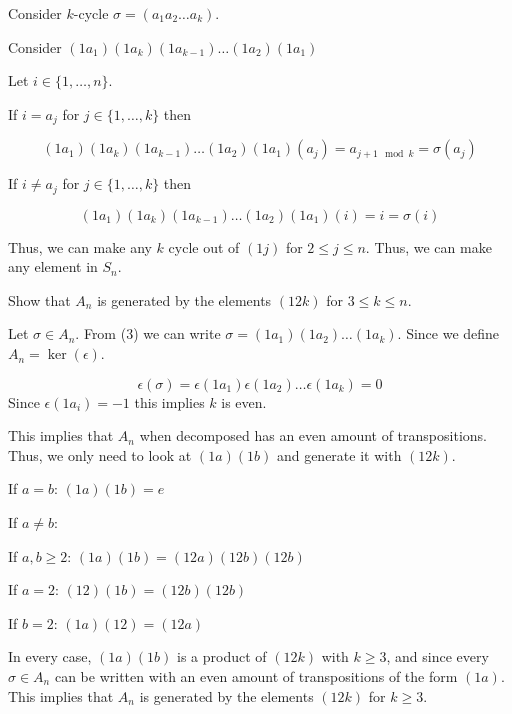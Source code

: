 \documentclass[12pt, letterpaper]{article}
\begin{document}
\begin{problemproof}
    Consider $k$-cycle $\sigma=(a_1a_2\dots a_k)$.

    Consider $(1a_1)(1a_k)(1a_{k-1})\dots(1a_2)(1a_1)$

    Let $i \in \{1,\dots,n\}$.

    If $i = a_j$ for $j \in \{1,\dots,k\}$ then

    \[(1a_1)(1a_k)(1a_{k-1})\dots(1a_2)(1a_1)(a_j)=a_{j+1 \mod k}=\sigma(a_j)\]

    If $i \neq a_j$ for $j \in \{1,\dots,k\}$ then

    \[(1a_1)(1a_k)(1a_{k-1})\dots(1a_2)(1a_1)(i)=i=\sigma(i)\]

    Thus, we can make any $k$ cycle out of $(1j)$ for $2 \leq j \leq n$. Thus, we can make any element in $S_n$.
\end{problemproof}
\begin{subproblem}{}
    Show that $A_n$ is generated by the elements $(12k)$ for $3 \leq k \leq n$.
\end{subproblem}
\begin{problemproof}
    Let $\sigma \in A_n$. From (3) we can write $\sigma=(1a_1)(1a_2)\dots(1a_k)$. Since we define $A_n = \ker(\epsilon)$.

    \[\epsilon(\sigma)=\epsilon(1a_1)\epsilon(1a_2)\dots\epsilon(1a_k)=0\]
    Since $\epsilon(1a_i)=-1$ this implies $k$ is even.
    
    This implies that $A_n$ when decomposed has an even amount of transpositions. Thus, we only need to look at $(1a)(1b)$ and generate it with $(12k)$.

    
    If $a = b$:
    $(1a)(1b)=e$

    If $a \neq b$:

    If $a,b \geq 2$:
    $(1a)(1b)=(12a)(12b)(12b)$

    If $a = 2$:
    $(12)(1b)=(12b)(12b)$

    If $b = 2$:
    $(1a)(12)=(12a)$

    In every case, $(1a)(1b)$ is a product of $(12k)$ with $k \geq 3$, and since every $\sigma \in A_n$ can be written with an even amount of transpositions of the form $(1a)$. This implies that $A_n$ is generated by the elements $(12k)$ for $k \geq 3$.
\end{problemproof}
\end{document}
